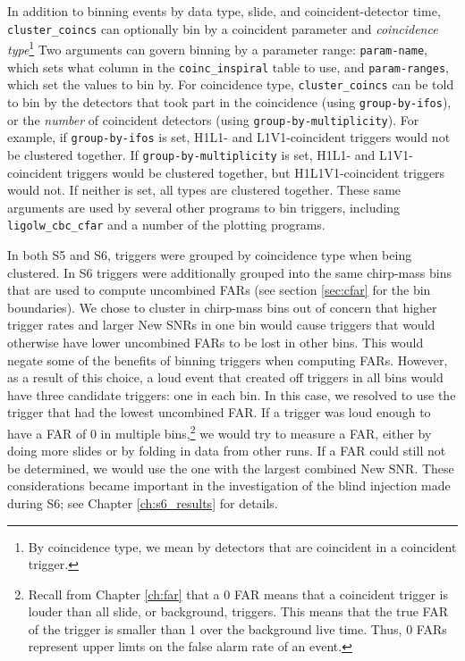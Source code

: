 In addition to binning events by data type, slide, and coincident-detector
time, \verb|cluster_coincs| can optionally bin by a coincident parameter and
\emph{coincidence type}\footnote{By coincidence type, we mean by detectors that
are coincident in a coincident trigger.} Two arguments can govern binning by a
parameter range: \verb|param-name|, which sets what column in the
\verb|coinc_inspiral| table to use, and \verb|param-ranges|, which set the
values to bin by. For coincidence type, \verb|cluster_coincs| can be told to
bin by the detectors that took part in the coincidence (using
\verb|group-by-ifos|), or the \emph{number} of coincident detectors (using
\verb|group-by-multiplicity|). For example, if \verb|group-by-ifos| is set,
H1L1- and L1V1-coincident triggers would not be clustered together. If
\verb|group-by-multiplicity| is set, H1L1- and L1V1-coincident triggers would
be clustered together, but H1L1V1-coincident triggers would not. If neither is
set, all types are clustered together. These same arguments are used by several
other programs to bin triggers, including \verb|ligolw_cbc_cfar| and a number
of the plotting programs.

In both \ac{S5} and \ac{S6}, triggers were grouped by coincidence type when
being clustered. In \ac{S6} triggers were additionally grouped into the same
chirp-mass bins that are used to compute uncombined \acp{FAR} (see section
\ref{sec:cfar} for the bin boundaries). We chose to cluster in chirp-mass bins
out of concern that higher trigger rates and larger New \acp{SNR} in one bin
would cause triggers that would otherwise have lower uncombined \acp{FAR} to be
lost in other bins. This would negate some of the benefits of binning triggers
when computing \acp{FAR}. However, as a result of this choice, a loud event
that created off triggers in all bins would have three candidate triggers: one
in each bin. In this case, we resolved to use the trigger that had the lowest
uncombined \ac{FAR}. If a trigger was loud enough to have a \ac{FAR} of $0$ in
multiple bins,\footnote{Recall from Chapter \ref{ch:far} that a 0 \ac{FAR}
means that a coincident trigger is louder than all slide, or background,
triggers. This means that the true \ac{FAR} of the trigger is smaller than 1
over the background live time. Thus, 0 \acp{FAR} represent upper limts on the
false alarm rate of an event.} we would try to measure a \ac{FAR}, either by
doing more slides or by folding in data from other runs. If a \ac{FAR} could
still not be determined, we would use the one with the largest combined New
\ac{SNR}. These considerations became important in the investigation of the
blind injection made during \ac{S6}; see Chapter \ref{ch:s6_results} for
details.

